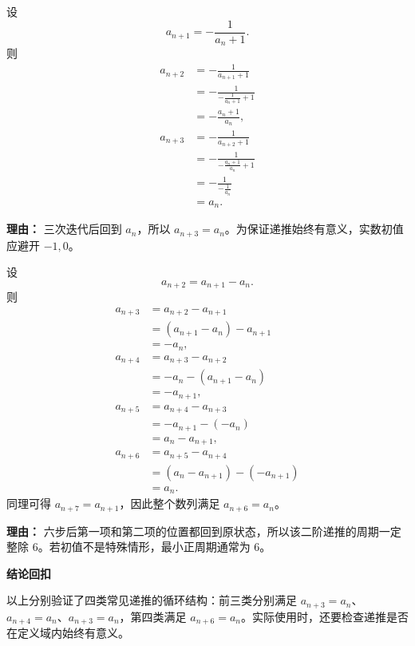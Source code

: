 \begin{proofbox}
\begin{description}[style=nextline, leftmargin=2.8em, labelsep=0.5em, itemsep=0.55em]
		\item[\textbf{步骤三（递推三验证）：}]
		      设
		      \[
			      a_{n+1}=-\frac1{a_n+1}.
		      \]
		      则
		      \[
			      \begin{aligned}
				      a_{n+2}
				       & =-\frac1{a_{n+1}+1}            \\[2pt]
				       & =-\frac1{-\frac1{a_n+1}+1}     \\[2pt]
				       & =-\frac{a_n+1}{a_n},           \\[4pt]
				      a_{n+3}
				       & =-\frac1{a_{n+2}+1}            \\[2pt]
				       & =-\frac1{-\frac{a_n+1}{a_n}+1} \\[2pt]
				       & =-\frac1{-\frac1{a_n}}         \\[2pt]
				       & =a_n.
			      \end{aligned}
		      \]
		      \par\textbf{理由：} 三次迭代后回到 \(a_n\)，所以 \(a_{n+3}=a_n\)。为保证递推始终有意义，实数初值应避开 \(-1,0\)。

		\item[\textbf{步骤四（二阶递推验证）：}]
		      设
		      \[
			      a_{n+2}=a_{n+1}-a_n.
		      \]
		      则
		      \[
			      \begin{aligned}
				      a_{n+3}
				       & =a_{n+2}-a_{n+1}          \\[2pt]
				       & =(a_{n+1}-a_n)-a_{n+1}    \\[2pt]
				       & =-a_n,                    \\[4pt]
				      a_{n+4}
				       & =a_{n+3}-a_{n+2}          \\[2pt]
				       & =-a_n-(a_{n+1}-a_n)       \\[2pt]
				       & =-a_{n+1},                \\[4pt]
				      a_{n+5}
				       & =a_{n+4}-a_{n+3}          \\[2pt]
				       & =-a_{n+1}-(-a_n)          \\[2pt]
				       & =a_n-a_{n+1},             \\[4pt]
				      a_{n+6}
				       & =a_{n+5}-a_{n+4}          \\[2pt]
				       & =(a_n-a_{n+1})-(-a_{n+1}) \\[2pt]
				       & =a_n.
			      \end{aligned}
		      \]
		      同理可得 \(a_{n+7}=a_{n+1}\)，因此整个数列满足 \(a_{n+6}=a_n\)。
		      \par\textbf{理由：} 六步后第一项和第二项的位置都回到原状态，所以该二阶递推的周期一定整除 \(6\)。若初值不是特殊情形，最小正周期通常为 \(6\)。
	\end{description}

	\medskip
	\textbf{\textcolor{CProof}{结论回扣}}

	以上分别验证了四类常见递推的循环结构：前三类分别满足 \(a_{n+3}=a_n\)、\(a_{n+4}=a_n\)、\(a_{n+3}=a_n\)，第四类满足 \(a_{n+6}=a_n\)。实际使用时，还要检查递推是否在定义域内始终有意义。
\end{proofbox}